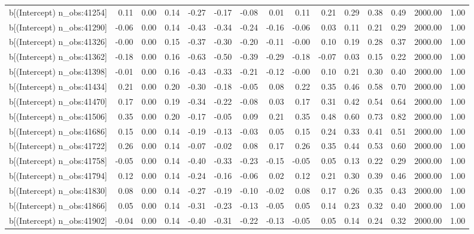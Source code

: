 \begin{table}[ht]
\begin{tabular}{rrrrrrrrrrrrrrr}
  b[(Intercept) n\_obs:41254] & 0.11 & 0.00 & 0.14 & -0.27 & -0.17 & -0.08 & 0.01 & 0.11 & 0.21 & 0.29 & 0.38 & 0.49 & 2000.00 & 1.00 \\ 
  b[(Intercept) n\_obs:41290] & -0.06 & 0.00 & 0.14 & -0.43 & -0.34 & -0.24 & -0.16 & -0.06 & 0.03 & 0.11 & 0.21 & 0.29 & 2000.00 & 1.00 \\ 
  b[(Intercept) n\_obs:41326] & -0.00 & 0.00 & 0.15 & -0.37 & -0.30 & -0.20 & -0.11 & -0.00 & 0.10 & 0.19 & 0.28 & 0.37 & 2000.00 & 1.00 \\ 
  b[(Intercept) n\_obs:41362] & -0.18 & 0.00 & 0.16 & -0.63 & -0.50 & -0.39 & -0.29 & -0.18 & -0.07 & 0.03 & 0.15 & 0.22 & 2000.00 & 1.00 \\ 
  b[(Intercept) n\_obs:41398] & -0.01 & 0.00 & 0.16 & -0.43 & -0.33 & -0.21 & -0.12 & -0.00 & 0.10 & 0.21 & 0.30 & 0.40 & 2000.00 & 1.00 \\ 
  b[(Intercept) n\_obs:41434] & 0.21 & 0.00 & 0.20 & -0.30 & -0.18 & -0.05 & 0.08 & 0.22 & 0.35 & 0.46 & 0.58 & 0.70 & 2000.00 & 1.00 \\ 
  b[(Intercept) n\_obs:41470] & 0.17 & 0.00 & 0.19 & -0.34 & -0.22 & -0.08 & 0.03 & 0.17 & 0.31 & 0.42 & 0.54 & 0.64 & 2000.00 & 1.00 \\ 
  b[(Intercept) n\_obs:41506] & 0.35 & 0.00 & 0.20 & -0.17 & -0.05 & 0.09 & 0.21 & 0.35 & 0.48 & 0.60 & 0.73 & 0.82 & 2000.00 & 1.00 \\ 
  b[(Intercept) n\_obs:41686] & 0.15 & 0.00 & 0.14 & -0.19 & -0.13 & -0.03 & 0.05 & 0.15 & 0.24 & 0.33 & 0.41 & 0.51 & 2000.00 & 1.00 \\ 
  b[(Intercept) n\_obs:41722] & 0.26 & 0.00 & 0.14 & -0.07 & -0.02 & 0.08 & 0.17 & 0.26 & 0.35 & 0.44 & 0.53 & 0.60 & 2000.00 & 1.00 \\ 
  b[(Intercept) n\_obs:41758] & -0.05 & 0.00 & 0.14 & -0.40 & -0.33 & -0.23 & -0.15 & -0.05 & 0.05 & 0.13 & 0.22 & 0.29 & 2000.00 & 1.00 \\ 
  b[(Intercept) n\_obs:41794] & 0.12 & 0.00 & 0.14 & -0.24 & -0.16 & -0.06 & 0.02 & 0.12 & 0.21 & 0.30 & 0.39 & 0.46 & 2000.00 & 1.00 \\ 
  b[(Intercept) n\_obs:41830] & 0.08 & 0.00 & 0.14 & -0.27 & -0.19 & -0.10 & -0.02 & 0.08 & 0.17 & 0.26 & 0.35 & 0.43 & 2000.00 & 1.00 \\ 
  b[(Intercept) n\_obs:41866] & 0.05 & 0.00 & 0.14 & -0.31 & -0.23 & -0.13 & -0.05 & 0.05 & 0.14 & 0.23 & 0.32 & 0.40 & 2000.00 & 1.00 \\ 
  b[(Intercept) n\_obs:41902] & -0.04 & 0.00 & 0.14 & -0.40 & -0.31 & -0.22 & -0.13 & -0.05 & 0.05 & 0.14 & 0.24 & 0.32 & 2000.00 & 1.00 \\ 

\end{tabular}
\end{table}
